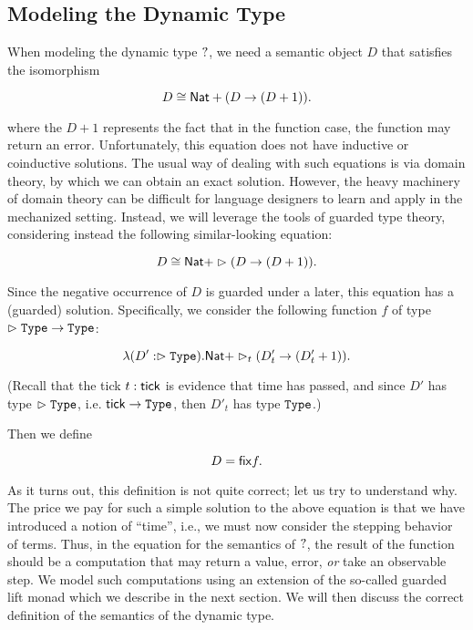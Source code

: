 \subsection{Modeling the Dynamic Type}

When modeling the dynamic type $?$, we need a semantic object $D$ that satisfies the
isomorphism

\[ D \cong \mathsf{Nat} + (D \to (D + 1)). \]

where the $D + 1$ represents the fact that in the function case, the function may return an error.
Unfortunately, this equation does not have inductive or coinductive solutions. The usual way of
dealing with such equations is via domain theory, by which we can obtain an exact solution.
However, the heavy machinery of domain theory can be difficult for language designers to learn
and apply in the mechanized setting.
Instead, we will leverage the tools of guarded type theory, considering instead the following
similar-looking equation:

\[ D \cong \mathsf{Nat} + \vartriangleright (D \to (D + 1)). \]

Since the negative occurrence of $D$ is guarded under a later, this equation has a (guarded) solution.
Specifically, we consider the following function $f$ of type
$\vartriangleright \texttt{Type} \to \texttt{Type}$:

\[ \lambda (D' : \vartriangleright \texttt{Type}) . \mathsf{Nat} + \vartriangleright_t (D'_t \to (D'_t + 1)). \]

(Recall that the tick $t : \mathsf{tick}$ is evidence that time has passed, and since
$D'$ has type $\vartriangleright \texttt{Type}$, i.e. $\mathsf{tick} \to \texttt{Type}$, then $D'_t$ has type $\texttt{Type}$.)

Then we define 

\[ D = \mathsf{fix} f. \]

As it turns out, this definition is not quite correct; let us try to understand why.
The price we pay for such a simple solution to the above equation is that we have
introduced a notion of ``time'', i.e., we must now consider the stepping behavior of terms.
Thus, in the equation for the semantics of $?$, the result of the function should be
a computation that may return a value, error, \emph{or} take an observable step.
We model such computations using an extension of the so-called guarded lift monad
\cite{mogelberg-paviotti2016} which we describe in the next section.
We will then discuss the correct definition of the semantics of the dynamic type.

